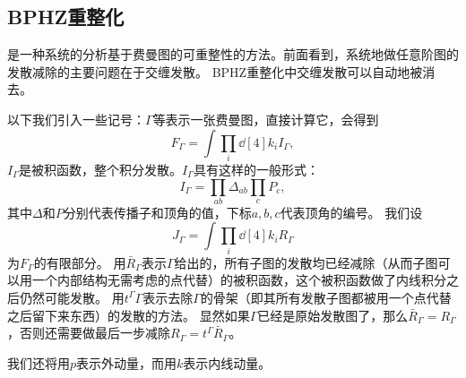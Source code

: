\subsection{BPHZ重整化}\label{sec:bphz}

是一种系统的分析基于费曼图的可重整性的方法。前面看到，系统地做任意阶图的发散减除的主要问题在于交缠发散。
BPHZ重整化中交缠发散可以自动地被消去。

以下我们引入一些记号：$\Gamma$等表示一张费曼图，直接计算它，会得到
\begin{equation}
    F_\Gamma = \int \prod_i \dd[4]{k_i} I_\Gamma,
\end{equation}
$I_\Gamma$是被积函数，整个积分发散。$I_\Gamma$具有这样的一般形式：
\begin{equation}
    I_\Gamma = \prod_{ab} \Delta_{ab} \prod_c P_c,
\end{equation}
其中$\Delta$和$P$分别代表传播子和顶角的值，下标$a, b, c$代表顶角的编号。
我们设
\begin{equation}
    J_\Gamma = \int \prod_i \dd[4]{k_i} R_\Gamma
\end{equation}
为$F_\Gamma$的有限部分。
用$\bar{R}_\Gamma$表示$\Gamma$给出的，所有子图的发散均已经减除（从而子图可以用一个内部结构无需考虑的点代替）的被积函数，这个被积函数做了内线积分之后仍然可能发散。
用$t^\Gamma \Gamma$表示去除$\Gamma$的骨架（即其所有发散子图都被用一个点代替之后留下来东西）的发散的方法。
显然如果$\Gamma$已经是原始发散图了，那么$\bar{R}_\Gamma = R_\Gamma$，否则还需要做最后一步减除$R_\Gamma = t^\Gamma \bar{R}_\Gamma$。

我们还将用$p$表示外动量，而用$k$表示内线动量。

